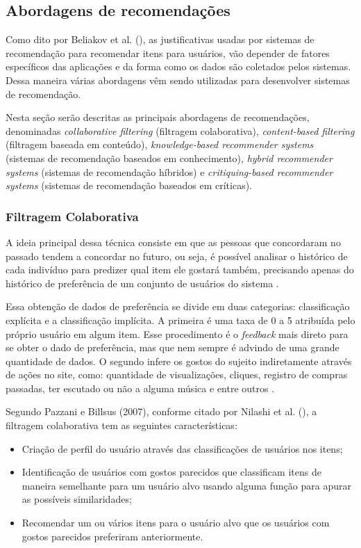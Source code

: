 \subsection{Abordagens de recomendações}

Como dito por Beliakov et al. (\citeyear{Beliakov:2011}), as justificativas usadas por sistemas de recomendação para recomendar itens para usuários, vão depender de fatores específicos das aplicações e da forma como os dados são coletados pelos sistemas. Dessa maneira várias abordagens vêm sendo utilizadas para desenvolver sistemas de recomendação.

Nesta seção serão descritas as principais abordagens de recomendações, denominadas \textit{collaborative filtering} (filtragem colaborativa), \textit{content-based filtering} (filtragem baseada em conteúdo), \textit{knowledge-based recommender systems} (sistemas de recomendação baseados em conhecimento), \textit{hybrid recommender systems} (sistemas de recomendação híbridos) e \textit{critiquing-based recommender systems} (sistemas de recomendação baseados em críticas).

\subsubsection{Filtragem Colaborativa} 
\label{Collaborativefiltering}
A ideia principal dessa técnica consiste em que as pessoas que concordaram no passado tendem a concordar no futuro, ou seja, é possível analisar o histórico de cada indivíduo para predizer qual item ele gostará também, precisando apenas do histórico de preferência de um conjunto de usuários do sistema \cite{Nilashi:2013}.

Essa obtenção de dados de preferência se divide em duas categorias: classificação explícita e a classificação implícita. A primeira é uma taxa de 0 a 5 atribuída pelo próprio usuário em algum item. Esse procedimento é o \textit{feedback} mais direto para se obter o dado de preferência, mas que nem sempre é advindo de uma grande quantidade de dados. O segundo infere os gostos do sujeito indiretamente através de ações no site, como: quantidade de visualizações, cliques, registro de compras passadas, ter escutado ou não a alguma música e entre outros \cite{luo:2018}.
	
Segundo Pazzani e Billsus (2007), conforme citado por Nilashi et al. (\citeyear{Nilashi:2013}), a filtragem colaborativa tem as seguintes características:

\begin{itemize}
    \item Criação de perfil do usuário através das classificações de usuários nos itens;
    \item Identificação de usuários com gostos parecidos que classificam itens de maneira semelhante para um usuário alvo usando alguma função para apurar as possíveis similaridades;
    \item Recomendar um ou vários itens para o usuário alvo que os usuários com gostos parecidos preferiram anteriormente.

\end{itemize}

